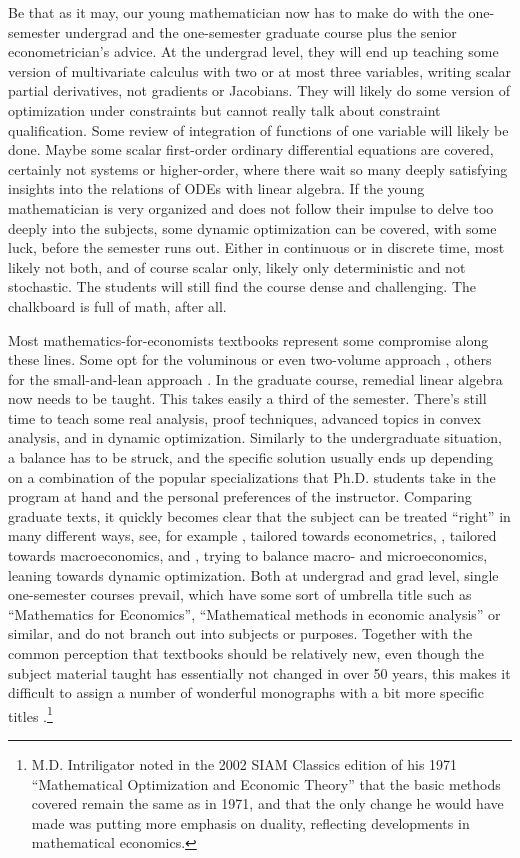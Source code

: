 \documentclass[graybox]{svmult}
\begin{document}
Be that as it may, our young mathematician now has to make do with the one-semester undergrad and the one-semester graduate course plus the senior econometrician's advice. At the undergrad level, they will end up teaching some version of multivariate calculus with two or at most three variables, writing scalar partial derivatives, not gradients or Jacobians. They will likely do some version of optimization under constraints but cannot really talk about constraint qualification. Some review of integration of functions of one variable will likely be done.  Maybe some scalar first-order ordinary differential equations are covered, certainly not systems or higher-order, where there wait so many deeply satisfying insights into the relations of ODEs with linear algebra. If the young mathematician is very organized and does not follow their impulse to delve too deeply into the subjects, some dynamic optimization can be covered, with some luck, before the semester runs out. Either in continuous or in discrete time, most likely not both, and of course scalar only, likely only deterministic and not stochastic. The students will still find the course dense and challenging. The chalkboard is full of math, after all. 

Most mathematics-for-economists textbooks represent some compromise along these lines. Some opt for the voluminous or even two-volume approach \citep{Simon1994,Hoy2001,Klein2002,Sydsaeter2022}, others for the small-and-lean approach \citep{Weintraub1982,Novshek1993}. In the graduate course, remedial linear algebra now needs to be taught. This takes easily a third of the semester. There's still time to teach some real analysis, proof techniques, advanced topics in convex analysis, and in dynamic optimization. Similarly to the undergraduate situation, a balance has to be struck, and the specific solution usually ends up depending on a combination of the popular specializations that Ph.D. students take in the program at hand and the personal preferences of the instructor. Comparing graduate texts, it quickly becomes clear that the subject can be treated ``right'' in many different ways, see, for example \cite{Ok2007}, tailored towards econometrics, \cite{Corbae2009}, tailored towards macroeconomics, and \cite{Sydsaeter2008}, trying to balance macro- and microeconomics, leaning towards dynamic optimization. Both at undergrad and grad level, single one-semester courses prevail, which have some sort of umbrella title such as ``Mathematics for Economics'', ``Mathematical methods in economic analysis'' or similar, and do not branch out into subjects or purposes.  Together with the common perception that textbooks should be relatively new, even though the subject material taught has essentially not changed in over 50 years, this makes it difficult to assign a number of wonderful monographs with a bit more specific titles \citep[for example,][and this is certainly not an exhaustive list]{Seierstad1987,Dixit1990,Intriligator2002,Dhrymes2013}.\footnote{M.D. Intriligator noted in the 2002 SIAM Classics edition of his 1971 ``Mathematical Optimization and Economic Theory'' that the basic methods covered remain the same as in 1971, and that the only change he would have made was putting more emphasis on duality, reflecting developments in mathematical economics.}
\end{document}

